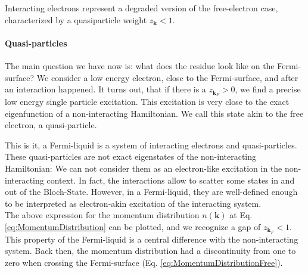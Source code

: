 \documentclass[../main.tex]{subfile}
\begin{document}
Interacting electrons represent a degraded version of the free-electron case, characterized by a quasiparticle weight $z_{\bm{k}} < 1$.\\

\paragraph{Quasi-particles}$~$\\

The main question we have now is: what does the residue look like on the Fermi-surface? We consider a low energy electron, close to the Fermi-surface, and 
after an interaction happened. It turns out, that if there is a $z_{\bm{k}_F}>0$, we find a precise low energy single particle excitation. This excitation is very close
to the exact eigenfunction of a non-interacting Hamiltonian. We call this state akin to the free electron, a quasi-particle.

This is it, a Fermi-liquid is a system of interacting electrons and quasi-particles. 
These quasi-particles are not exact eigenstates of the non-interacting Hamiltonian:
We can not consider them as an electron-like excitation in the non-interacting context. In fact,
the interactions allow to scatter some states in and out of the Bloch-State. However, in a Fermi-liquid, they are well-defined
enough to be interpreted as electron-akin excitation of the interacting system. \\

The above expression for the momentum distribution $n(\bm{k})$ at Eq. \ref{eq:MomentumDistribution} can be plotted,
 and we recognize a gap of $z_{\bm{k}_F}<1$. 
 This property of the Fermi-liquid is a central difference with the non-interacting
system. Back then, the momentum distribution had a discontinuity from one to zero when crossing the Fermi-surface (Eq. \ref{eq:MomentumDistributionFree}).\\
\end{document}
